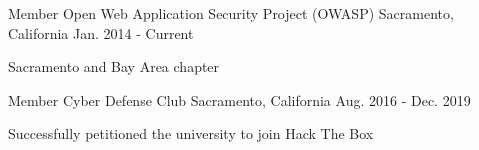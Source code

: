 

\begin{cventries}
  \cventry
    {Member} %
    {Open Web Application Security Project (OWASP)} %
    {Sacramento, California} %
    {Jan. 2014 - Current} %
    {
      \begin{cvitems} %
        \item {Sacramento and Bay Area chapter}
      \end{cvitems}
    }

  \cventry
    {Member} %
    {Cyber Defense Club} %
    {Sacramento, California} %
    {Aug. 2016 - Dec. 2019} %
    {
      \begin{cvitems} %
        \item {Successfully petitioned the university to join Hack The Box}
      \end{cvitems}
    }

\end{cventries}
